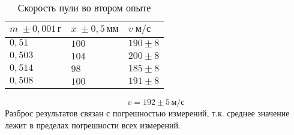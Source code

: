 \begin{table}[ht!]
    \caption{Скорость пули во втором опыте}
    \begin{tabular}{|l|l|l|}
    \hline
    $m\;\pm 0{,}001\,\text{г}$ & $x\;\pm 0{,}5\,\text{мм}$ & $v\;\text{м}/\text{с}$ \\ \hline
    $0{,}51$                   & $100$                     & $190\pm 8$             \\ \hline
    $0{,}503$                  & $104$                     & $200\pm 8$             \\ \hline
    $0{,}514$                  & $98$                      & $185\pm 8$             \\ \hline
    $0{,}508$                  & $100$                     & $191\pm 8$             \\ \hline
    \end{tabular}
\end{table}

\[v=192\pm 5\,\text{м}/\text{с}\]
Разброс результатов связан с погрешностью измерений, т.к. среднее значение лежит в пределах погрешности всех измерений.

